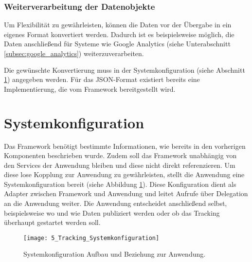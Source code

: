 \subsubsection{Weiterverarbeitung der Datenobjekte}
Um Flexibilität zu gewährleisten, können die Daten vor der Übergabe in ein eigenes Format konvertiert werden. Dadurch ist es beispielsweise möglich, die Daten anschließend für Systeme wie Google Analytics (siehe Unterabschnitt \ref{subsec:google_analytics}) weiterzuverarbeiten. 

Die gewünschte Konvertierung muss in der Systemkonfiguration (siehe Abschnitt \ref{sec:integration_concept}) angegeben werden. Für das JSON-Format existiert bereits eine Implementierung, die vom Framework bereitgestellt wird.

\section{Systemkonfiguration}
\label{sec:integration_concept}
Das Framework benötigt bestimmte Informationen, wie bereits in den vorherigen Komponenten beschrieben wurde. Zudem soll das Framework unabhängig von den Services der Anwendung bleiben und diese nicht direkt referenzieren. Um diese lose Kopplung zur Anwendung zu gewährleisten, stellt die Anwendung eine Systemkonfiguration bereit (siehe Abbildung \ref{fig:structure_relationship_systemconfiguration}). Diese Konfiguration dient als Adapter zwischen Framework und Anwendung und leitet Aufrufe über Delegation an die Anwendung weiter. Die Anwendung entscheidet anschließend selbst, beispielsweise wo und wie Daten publiziert werden oder ob das Tracking überhaupt gestartet werden soll.

\begin{figure}[H]
\centering
\texttt{[image: 5\_Tracking\_Systemkonfiguration]}
\caption{Systemkonfiguration Aufbau und Beziehung zur Anwendung.}
\label{fig:structure_relationship_systemconfiguration}
\end{figure}




